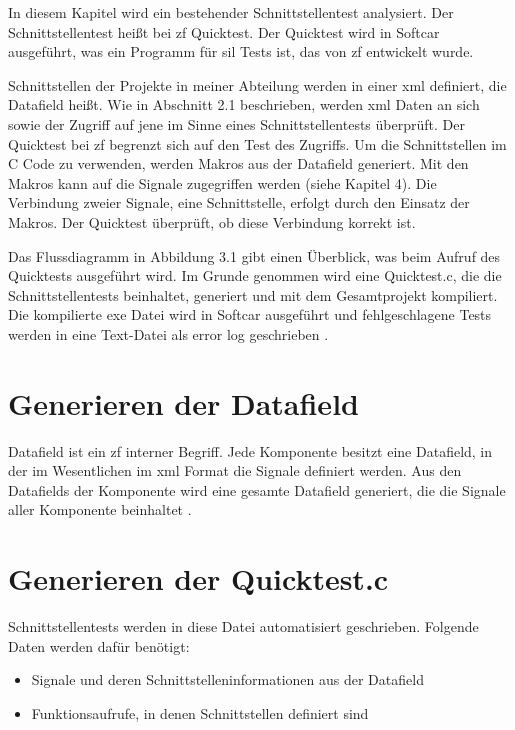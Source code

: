 In diesem Kapitel wird ein bestehender Schnittstellentest analysiert. Der Schnittstellentest heißt bei \ac{zf} Quicktest.
Der Quicktest wird in Softcar ausgeführt, was ein Programm für \ac{sil} Tests ist, das von \ac{zf} entwickelt wurde.

Schnittstellen der Projekte in meiner Abteilung werden in einer \ac{xml} definiert, die Datafield heißt.
Wie in Abschnitt 2.1 beschrieben, werden \ac{xml} Daten an sich sowie der Zugriff auf jene im Sinne eines Schnittstellentests
überprüft. Der Quicktest bei \ac{zf} begrenzt sich auf den Test des Zugriffs. Um die Schnittstellen im C Code zu
verwenden, werden Makros aus der Datafield generiert. Mit den Makros kann auf die Signale zugegriffen werden (siehe Kapitel 4).
Die Verbindung zweier Signale, eine Schnittstelle, erfolgt durch den Einsatz der Makros. Der Quicktest überprüft, ob
diese Verbindung korrekt ist.

Das Flussdiagramm in Abbildung 3.1 gibt einen Überblick, was beim Aufruf des Quicktests ausgeführt wird.
Im Grunde genommen wird eine Quicktest.c, die die Schnittstellentests beinhaltet, generiert und mit dem Gesamtprojekt kompiliert. 
Die kompilierte \ac{exe} Datei wird in Softcar ausgeführt und fehlgeschlagene Tests
werden in eine Text-Datei als error log geschrieben \parencite[]{quicktestc}\parencite[]{quicktestlog}\parencite[]{datafield}.


\newpage
\section*{Generieren der Datafield}
Datafield ist ein \ac{zf} interner Begriff. Jede Komponente besitzt eine Datafield, in der im Wesentlichen im \ac{xml} Format die Signale definiert werden.
Aus den Datafields der Komponente wird eine gesamte Datafield generiert, die die Signale aller Komponente beinhaltet \parencite[]{datafield}.

\section*{Generieren der Quicktest.c}
Schnittstellentests werden in diese Datei automatisiert geschrieben.
Folgende Daten werden dafür benötigt:
\begin{itemize}
\item Signale und deren Schnittstelleninformationen aus der Datafield \parencite[]{datafield}%
\item Funktionsaufrufe, in denen Schnittstellen definiert sind
\end{itemize}

